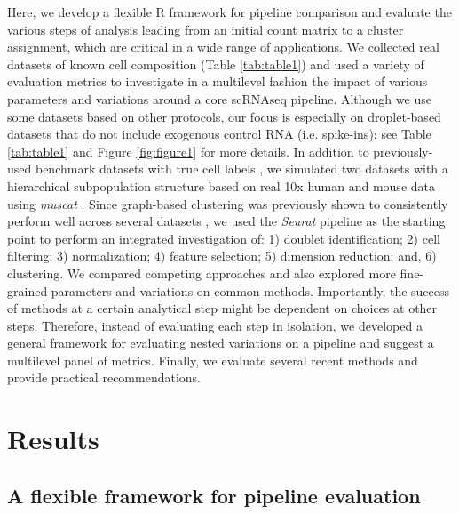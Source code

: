 \documentclass{bmcart}
\begin{document}
Here, we develop a flexible R framework for pipeline comparison and evaluate the various steps of analysis leading from an initial count matrix to a cluster assignment, which are critical in a wide range of applications. We collected real datasets of known cell composition (Table \ref{tab:table1}) and used a variety of evaluation metrics to investigate in a multilevel fashion the impact of various parameters and variations around a core scRNAseq pipeline. Although we use some datasets based on other protocols, our focus is especially on droplet-based datasets that do not include exogenous control RNA (i.e. spike-ins); see Table \ref{tab:table1} and Figure \ref{fig:figure1} for more details. In addition to previously-used benchmark datasets with true cell labels \cite{duoClustering2018,tianMixology2018}, we simulated two datasets with a hierarchical subpopulation structure based on real 10x human and mouse data using \textit{muscat} \cite{CrowellMuscat2019}. 
Since graph-based clustering \cite{satijaSeurat2015} was previously shown to consistently perform well across several datasets \cite{duoClustering2018,tianMixology2018}, we used the \textit{Seurat} pipeline as the starting point to perform an integrated investigation of: 1) doublet identification; 2) cell filtering; 3) normalization; 4) feature selection; 5) dimension reduction; and, 6) clustering. We compared competing approaches and also explored more fine-grained parameters and variations on common methods. Importantly, the success of methods at a certain analytical step might be dependent on choices at other steps. Therefore, instead of evaluating each step in isolation, we developed a general framework for evaluating nested variations on a pipeline and suggest a multilevel panel of metrics. Finally, we evaluate several recent methods and provide practical recommendations.

\section*{Results}

\subsection*{A flexible framework for pipeline evaluation}
\end{document}

